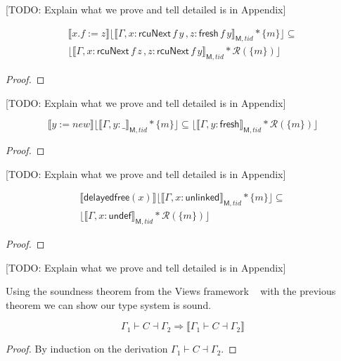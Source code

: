 [TODO: Explain what we prove and tell detailed is in Appendix]

\begin{Lemma}
\begin{gather*}
\llbracket x.f:=z \rrbracket \lfloor \llbracket \Gamma,x:\mathsf{rcuNext} \, f \, y \, , z:\mathsf{fresh} \, f \, y \rrbracket_{\textsf{M},tid} * \{m\}\rfloor \subseteq \\ \lfloor \llbracket \Gamma,x:\mathsf{rcuNext} \, f \, z \, , z:\mathsf{rcuNext} \, f \, y  \rrbracket_{\textsf{M},tid}  * \mathcal{R}(\{m\})\rfloor 
\end{gather*}
\end{Lemma}
\begin{proof}
\end{proof}

[TODO: Explain what we prove and tell detailed is in Appendix]

\begin{Lemma}
\[
\llbracket y := new \rrbracket \lfloor \llbracket \Gamma,y:\_ \rrbracket_{\textsf{M},tid} * \{m\}\rfloor  \subseteq \lfloor \llbracket \Gamma,y:\mathsf{fresh} \rrbracket_{\textsf{M},tid}  * \mathcal{R}(\{m\})\rfloor 
\]
\end{Lemma}
\begin{proof}
\end{proof}

[TODO: Explain what we prove and tell detailed is in Appendix]

\begin{Lemma}
\begin{gather*}
\llbracket  \mathsf{delayedfree}(x) \rrbracket \lfloor \llbracket \Gamma,x:\mathsf{unlinked} \rrbracket_{\textsf{M},tid} * \{m\}\rfloor  \subseteq \\ 
\lfloor \llbracket \Gamma,x:\mathsf{undef} \rrbracket_{\textsf{M},tid} * \mathcal{R}(\{m\})\rfloor 
\end{gather*}
\end{Lemma}
\begin{proof}
\end{proof}

[TODO: Explain what we prove and tell detailed is in Appendix]

Using the soundness theorem from the Views framework ~\cite{views} with the previous theorem we can show our type system is sound.

\begin{theorem}
\[ \Gamma_{1} \vdash C \dashv \Gamma_{2} \Longrightarrow \llbracket \Gamma_{1} \vdash C \dashv \Gamma_{2} \rrbracket \]
\end{theorem}
\begin{proof}
By induction on the derivation $ \Gamma_{1} \vdash C \dashv \Gamma_{2}$. 
\end{proof}

